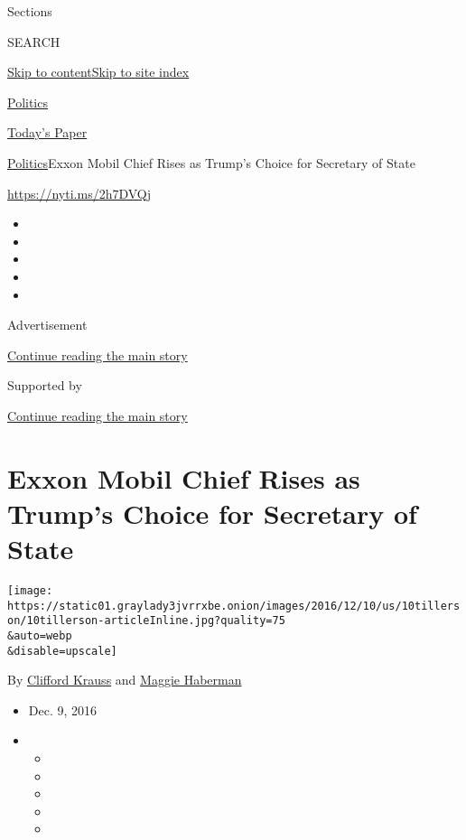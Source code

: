 Sections

SEARCH

\protect\hyperlink{site-content}{Skip to
content}\protect\hyperlink{site-index}{Skip to site index}

\href{https://www.nytimes3xbfgragh.onion/section/politics}{Politics}

\href{https://myaccount.nytimes3xbfgragh.onion/auth/login?response_type=cookie\&client_id=vi}{}

\href{https://www.nytimes3xbfgragh.onion/section/todayspaper}{Today's
Paper}

\href{/section/politics}{Politics}\textbar{}Exxon Mobil Chief Rises as
Trump's Choice for Secretary of State

\url{https://nyti.ms/2h7DVQj}

\begin{itemize}
\item
\item
\item
\item
\item
\end{itemize}

Advertisement

\protect\hyperlink{after-top}{Continue reading the main story}

Supported by

\protect\hyperlink{after-sponsor}{Continue reading the main story}

\hypertarget{exxon-mobil-chief-rises-as-trumps-choice-for-secretary-of-state}{%
\section{Exxon Mobil Chief Rises as Trump's Choice for Secretary of
State}\label{exxon-mobil-chief-rises-as-trumps-choice-for-secretary-of-state}}

\texttt{[image: https://static01.graylady3jvrrxbe.onion/images/2016/12/10/us/10tillerson/10tillerson-articleInline.jpg?quality=75\\\&auto=webp\\\&disable=upscale]}

By \href{http://www.nytimes3xbfgragh.onion/by/clifford-krauss}{Clifford
Krauss} and
\href{http://www.nytimes3xbfgragh.onion/by/maggie-haberman}{Maggie
Haberman}

\begin{itemize}
\item
  Dec. 9, 2016
\item
  \begin{itemize}
  \item
  \item
  \item
  \item
  \item
  \end{itemize}
\end{itemize}

